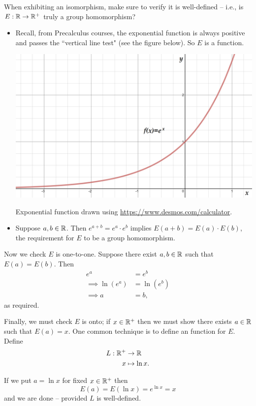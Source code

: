 \documentclass[../algebraNotesMSRI-UP2016.tex]{subfiles}
\begin{document}
\begin{frame}{}{}
\pf When exhibiting an isomorphism, make sure to verify it is well-defined -- i.e., is $E:\mathbb R\to \mathbb R^+$ truly a group homomorphism?
\begin{itemize}
\item Recall, from Precalculus courses, the exponential function is always positive and passes the ``vertical line test" (see the figure below).  So $E$ is a function.

\begin{center}
\includegraphics[scale=0.2]{expFunction}

{\footnotesize Exponential function drawn using \url{https://www.desmos.com/calculator}.}
\end{center}
\end{itemize}
\end{frame}

\begin{frame}
\begin{itemize}
\item Suppose $a,b\in\mathbb R$.  Then $e^{a+b}=e^a\cdot e^b$ implies $E(a+b)=E(a)\cdot E(b)$, the requirement for $E$ to be a group homomorphism.
\end{itemize}

\smallGap
Now we check $E$ is one-to-one.  Suppose there exist $a,b\in \mathbb R$ such that $E(a)=E(b)$.  Then 
\begin{align*}
e^a &= e^b \\
\implies \ln{(e^a)} &= \ln{(e^b)} \\
\implies a &= b,
\end{align*}
as required.
\end{frame}

\begin{frame}
Finally, we must check $E$ is onto; if $x\in\mathbb R^+$ then we must show there exists $a\in\mathbb R$ such that $E(a)=x$.  One common technique is to define an  function for $E$.  Define
\begin{align*}
L:\mathbb R^+ &\to \mathbb R \\
x &\mapsto \ln x.
\end{align*}

\smallGap
If we put $a=\ln x$ for fixed $x\in\mathbb R^+$ then 
\[
E(a)=E(\ln x)=e^{\ln x}=x
\]
and we are done -- provided $L$ is well-defined.
\end{frame}
\end{document}
